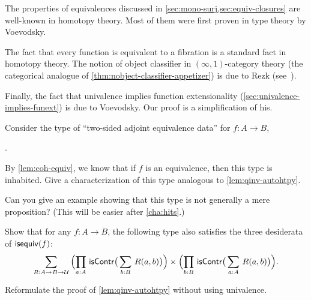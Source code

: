 The properties of equivalences discussed in \autoref{sec:mono-surj,sec:equiv-closures} are well-known in homotopy theory.
Most of them were first proven in type theory by Voevodsky.

The fact that every function is equivalent to a fibration is a standard fact in homotopy theory.
The notion of object classifier
%
%
in $(\infty,1)$-category
%
theory (the categorical analogue of \autoref{thm:nobject-classifier-appetizer}) is due to Rezk (see~\cite{Rezk05,lurie:higher-topoi}).

Finally, the fact that univalence implies function extensionality (\autoref{sec:univalence-implies-funext}) is due to Voevodsky.
Our proof is a simplification of his.

\sectionExercises

\begin{ex}
  Consider the type of ``two-sided adjoint equivalence data'' for $f:A\to B$,
  \begin{narrowmultline*}
    \narrowbreak
     \times
    .
  \end{narrowmultline*}
  By \autoref{lem:coh-equiv}, we know that if $f$ is an equivalence, then this type is inhabited.
  Give a characterization of this type analogous to \autoref{lem:qinv-autohtpy}.

  Can you give an example showing that this type is not generally a mere proposition?
  (This will be easier after \autoref{cha:hits}.)
\end{ex}

\begin{ex}
  Show that for any $f:A\to B$, the following type also satisfies the three desiderata of $\mathsf{isequiv}(f)$:
  \begin{equation*}
    \sm{R:A\to B\to \type}
    \Parens{\prd{a:A} \iscontr\big(\sm{b:B} R(a,b)\big)} \times
    \Parens{\prd{b:B} \iscontr\big(\sm{a:A} R(a,b)\big)}.
  \end{equation*}
\end{ex}

\begin{ex} \label{ex:qinv-autohtpy-no-univalence}
  Reformulate the proof of \autoref{lem:qinv-autohtpy} without using univalence.
\end{ex}

